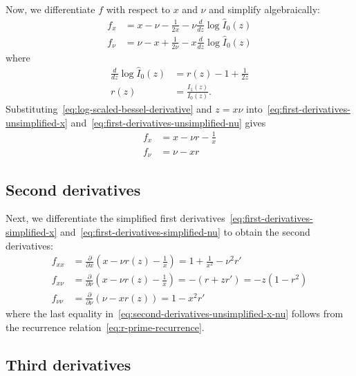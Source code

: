 \documentclass{article}
\begin{document}
Now, we differentiate $f$ with respect to $x$ and $\nu$ and simplify algebraically:
%
\begin{align}
  f_x   & = x-\nu -\frac{1}{2x} - \nu\frac{d}{dz}\log\hat{I}_0(z) \label{eq:first-derivatives-unsimplified-x}  \\
  f_\nu & = \nu-x +\frac{1}{2\nu} - x\frac{d}{dz}\log\hat{I}_0(z) \label{eq:first-derivatives-unsimplified-nu}
\end{align}
%
where
%
\begin{align}
  \frac{d}{dz}\log\hat{I}_0(z) & = r(z) - 1 + \frac{1}{2z} \label{eq:log-scaled-bessel-derivative} \\
  r(z)                         & = \frac{I_1(z)}{I_0(z)}. \label{eq:ratio-r}
\end{align}
%
Substituting~\eqref{eq:log-scaled-bessel-derivative} and $z=x\nu$ into~\eqref{eq:first-derivatives-unsimplified-x} and~\eqref{eq:first-derivatives-unsimplified-nu} gives
%
\begin{align}
  f_x   & = x - \nu r - \frac{1}{x} \label{eq:first-derivatives-simplified-x} \\
  f_\nu & = \nu - x r \label{eq:first-derivatives-simplified-nu}
\end{align}

\subsection{Second derivatives}

Next, we differentiate the simplified first derivatives~\eqref{eq:first-derivatives-simplified-x} and~\eqref{eq:first-derivatives-simplified-nu} to obtain the second derivatives:
%
\begin{align}
  f_{xx}     & = \frac{\partial}{\partial x}\left(x - \nu r(z) - \frac{1}{x}\right) = 1 + \frac{1}{x^2} - \nu^2 r' \label{eq:second-derivatives-unsimplified-x-x} \\
  f_{x\nu}   & = \frac{\partial}{\partial \nu}\left(x - \nu r(z) - \frac{1}{x}\right) = -(r + z r') = -z(1 - r^2) \label{eq:second-derivatives-unsimplified-x-nu} \\
  f_{\nu\nu} & = \frac{\partial}{\partial \nu}\left(\nu - x r(z)\right) = 1 - x^2 r' \label{eq:second-derivatives-unsimplified-nu-nu}
\end{align}
%
where the last equality in~\eqref{eq:second-derivatives-unsimplified-x-nu} follows from the recurrence relation~\eqref{eq:r-prime-recurrence}.

\subsection{Third derivatives}
\end{document}

